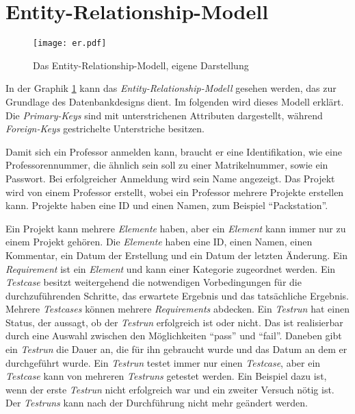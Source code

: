 \documentclass[11pt,a4paper]{report}
\begin{document}
\section{Entity-Relationship-Modell} \label{s:erm}

\begin{figure}[htpb]
  \centering
  \texttt{[image: er.pdf]}
  \caption{Das Entity-Relationship-Modell, eigene Darstellung}
  \label{f:erd}
\end{figure}


In der Graphik \ref{f:erd} kann das \textit{Entity-Relationship-Modell} gesehen werden, das zur Grundlage des Datenbankdesigns dient. Im folgenden wird dieses Modell erklärt. Die \textit{Primary-Keys} sind mit unterstrichenen Attributen dargestellt, während \textit{Foreign-Keys} gestrichelte Unterstriche besitzen.


Damit sich ein Professor anmelden kann, braucht er eine Identifikation, wie eine Professorennummer, die ähnlich sein soll zu einer Matrikelnummer, sowie ein Passwort. Bei erfolgreicher Anmeldung wird sein Name angezeigt. Das Projekt wird von einem Professor erstellt, wobei ein Professor mehrere Projekte erstellen kann. Projekte haben eine ID und einen Namen, zum Beispiel "`Packstation"'. 

Ein Projekt kann mehrere \textit{Elemente} haben, aber ein \textit{Element} kann immer nur zu einem Projekt gehören. Die \textit{Elemente} haben eine ID, einen Namen, einen Kommentar, ein Datum der Erstellung und ein Datum der letzten Änderung. Ein \textit{Requirement} ist ein \textit{Element} und kann einer Kategorie zugeordnet werden. Ein \textit{Testcase} besitzt weitergehend die notwendigen Vorbedingungen für die durchzuführenden Schritte, das erwartete Ergebnis und das tatsächliche Ergebnis. Mehrere \textit{Testcases} können mehrere \textit{Requirements} abdecken. Ein \textit{Testrun} hat einen Status, der aussagt, ob der \textit{Testrun} erfolgreich ist oder nicht. Das ist realisierbar durch eine Auswahl zwischen den Möglichkeiten "`pass"' und "`fail"'. Daneben gibt ein \textit{Testrun} die Dauer an, die für ihn gebraucht wurde und das Datum an dem er durchgeführt wurde. Ein \textit{Testrun} testet immer nur einen \textit{Testcase}, aber ein \textit{Testcase} kann von mehreren \textit{Testruns} getestet werden. Ein Beispiel dazu ist, wenn der erste \textit{Testrun} nicht erfolgreich war und ein zweiter Versuch nötig ist. Der \textit{Testruns} kann nach der Durchführung nicht mehr geändert werden.
\end{document}
